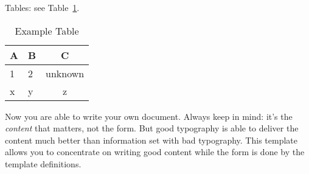 Tables: see Table~\ref{tab:example}.

\begin{table}
	\centering
	\begin{tabular}{llc}
	\toprule
	A & B & C\\
	\midrule
	1 & 2 & unknown\\
	x & y & z\\
	\bottomrule
	\end{tabular}
	\caption{Example Table}
	\label{tab:example}
\end{table}

Now you are able to write your own document. Always keep in mind: it's
the \emph{content} that matters, not the form. But good typography is
able to deliver the content much better than information set with bad
typography. This template allows you to concentrate on writing good
content while the form is done by the template definitions.